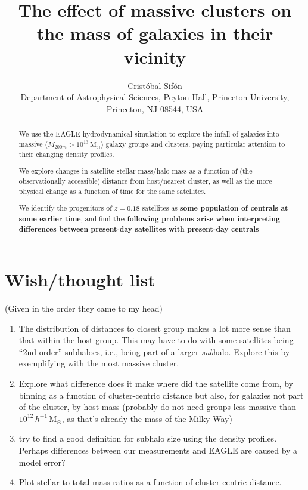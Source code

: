 \documentclass[usenatbib,fleqn]{mnras}
\title[Mass content of satellites in EAGLE]{The effect of massive clusters on the mass of galaxies in their vicinity}
\author[C.\ Sif\'on]{Crist\'obal Sif\'on
\\
Department of Astrophysical Sciences, Peyton Hall, Princeton University, Princeton, NJ 08544, USA
}
\newcommand{\Msun}{\mathrm{M}_\odot}
\begin{document}
\label{firstpage}
\pagerange{\pageref{firstpage}--\pageref{lastpage}}


\maketitle

\begin{abstract}
  We use the EAGLE hydrodynamical simulation to explore the infall of galaxies into massive ($M_{200m}>10^{13}\,\Msun$) galaxy groups and clusters, paying particular attention to their changing density profiles.
  
  We explore changes in satellite stellar mass/halo mass as a function of (the observationally accessible) distance from host/nearest cluster, as well as the more physical change as a function of time for the same satellites.
  
  We identify the progenitors of $z=0.18$ satellites as \textbf{some population of centrals at some earlier time}, and find \textbf{the following problems arise when interpreting differences between present-day satellites with present-day centrals}

\end{abstract}



\section{Wish/thought list}

(Given in the order they came to my head)

\begin{enumerate}
  \item The distribution of distances to closest group makes a lot more sense than that within the host group. This may have to do with some satellites being ``2nd-order'' subhaloes, i.e., being part of a larger \emph{sub}halo. Explore this by exemplifying with the most massive cluster.
  \item Explore what difference does it make where did the satellite come from, by binning as a function of cluster-centric distance but also, for galaxies not part of the cluster, by host mass (probably do not need groups less massive than $10^{12}\,h^{-1}\,\Msun$, as that's already the mass of the Milky Way)
  \item try to find a good definition for subhalo size using the density profiles. Perhaps differences between our measurements and EAGLE are caused by a model error?
  \item Plot stellar-to-total mass ratios as a function of cluster-centric distance.
\end{enumerate}
\end{document}

